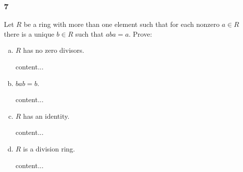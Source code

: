 \subsubsection*{7}
\begin{graybox}
	Let $R$ be a ring with more than one element such that for each nonzero $a \in R$ there is a unique $b \in R$ such that $aba = a$. Prove:
\end{graybox}
\begin{enumerate}[(a)]
	\item 
	\begin{lightgraybox}
		$R$ has no zero divisors.
	\end{lightgraybox}
	\begin{solution}
		content...
	\end{solution}
	
	\item
	\begin{lightgraybox}
		$bab = b$.
	\end{lightgraybox}
	\begin{solution}
		content...
	\end{solution}
	
	\item
	\begin{lightgraybox}
		$R$ has an identity.
	\end{lightgraybox}
	\begin{solution}
		content...
	\end{solution}
	
	\item
	\begin{lightgraybox}
		$R$ is a division ring.
	\end{lightgraybox}
	\begin{solution}
		content...
	\end{solution}
\end{enumerate}

